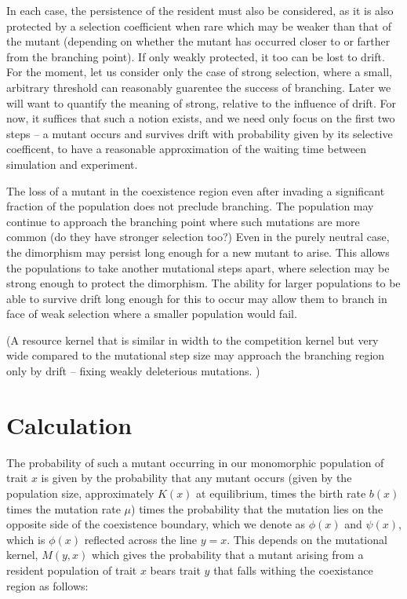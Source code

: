 \documentclass[letterpaper,10pt]{article}
\begin{document}
In each case, the persistence of the resident must also be considered, as it is also protected by a selection coefficient when rare which may be weaker than that of the mutant (depending on whether the mutant has occurred closer to or farther from the branching point).  If only weakly protected, it too can be lost to drift.  For the moment, let us consider only the case of strong selection, where a small, arbitrary threshold can reasonably guarentee the success of branching.  Later we will want to quantify the meaning of strong, relative to the influence of drift.  For now, it suffices that such a notion exists, and we need only focus on the first two steps -- a mutant occurs and survives drift with probability given by its selective coefficent, to have a reasonable approximation of the waiting time between simulation and experiment.   

The loss of a mutant in the coexistence region even after invading a significant fraction of the population does not preclude branching.  The population may continue to approach the branching point where such mutations are more common (do they have stronger selection too?)  Even in the purely neutral case, the dimorphism may persist long enough for a new mutant to arise.  This allows the populations to take another mutational steps apart, where selection may be strong enough to protect the dimorphism.  The ability for larger populations to be able to survive drift long enough for this to occur may allow them to branch in face of weak selection where a smaller population would fail.  

(A resource kernel that is similar in width to the competition kernel but very wide compared to the mutational step size may approach the branching region only by drift -- fixing weakly deleterious mutations.  )

\section{Calculation}
The probability of such a mutant occurring in our monomorphic population of trait $x$ is given by the probability that any mutant occurs (given by the population size, approximately $K(x)$ at equilibrium, times the birth rate $b(x)$ times the mutation rate $\mu$) times the probability that the mutation lies on the opposite side of the coexistence boundary, which we denote as $\phi(x)$ and $\psi(x)$, which is $\phi(x)$ reflected across the line $y=x$.  This depends on the mutational kernel, $M(y,x)$ which gives the probability that a mutant arising from a resident population of trait $x$ bears trait $y$ that falls withing the coexistance region as follows:
\end{document}
